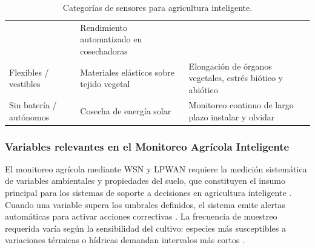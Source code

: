 \begin{table}[H]
\begin{tabularx}{\textwidth}{
            >{\raggedright\arraybackslash}p{2.8cm}
            >{\raggedright\arraybackslash}X
            >{\raggedright\arraybackslash}X}
                          & Rendimiento automatizado en cosechadoras             \\
            Flexibles / vestibles
                          & Materiales elásticos sobre tejido vegetal
                          & Elongación de órganos vegetales, estrés biótico y
            abiótico                                                             \\
            Sin batería / autónomos
                          & Cosecha de energía solar
                          & Monitoreo continuo de largo plazo
            instalar y olvidar                                                   \\
            \bottomrule
      \end{tabularx}
      \caption{Categorías de sensores para agricultura inteligente.
            \parencite{rajak2023internet, pyingkodi2022sensor,
                  alahmad2023applying}}
      \label{tab:sensores_agricultura}
\end{table}


\subsubsection{Variables relevantes en el Monitoreo
      Agrícola Inteligente}

El monitoreo agrícola mediante WSN y LPWAN requiere la medición
sistemática de variables ambientales y propiedades del suelo,
que constituyen el insumo principal para los sistemas de soporte
a decisiones en agricultura inteligente
\parencite{alahmad2023applying}. Cuando una variable supera
los umbrales definidos, el sistema emite alertas automáticas para
activar acciones correctivas \parencite{ rajak2023internet}.
La frecuencia de muestreo requerida varía según la sensibilidad
del cultivo: especies más susceptibles a variaciones térmicas o
hídricas demandan intervalos más cortos
\parencite{alahmad2023applying}.

